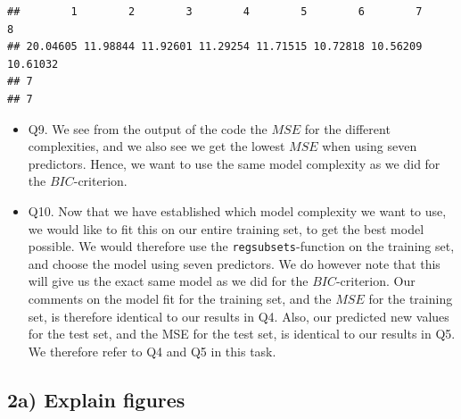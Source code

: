 \documentclass[]{article}
\begin{document}
\begin{verbatim}
##        1        2        3        4        5        6        7        8 
## 20.04605 11.98844 11.92601 11.29254 11.71515 10.72818 10.56209 10.61032 
## 7 
## 7
\end{verbatim}

\begin{itemize}
\item
  Q9. We see from the output of the code the \(MSE\) for the different
  complexities, and we also see we get the lowest \(MSE\) when using
  seven predictors. Hence, we want to use the same model complexity as
  we did for the \(BIC\)-criterion.
\item
  Q10. Now that we have established which model complexity we want to
  use, we would like to fit this on our entire training set, to get the
  best model possible. We would therefore use the
  \texttt{regsubsets}-function on the training set, and choose the model
  using seven predictors. We do however note that this will give us the
  exact same model as we did for the \(BIC\)-criterion. Our comments on
  the model fit for the training set, and the \(MSE\) for the training
  set, is therefore identical to our results in Q4. Also, our predicted
  new values for the test set, and the MSE for the test set, is
  identical to our results in Q5. We therefore refer to Q4 and Q5 in
  this task.
\end{itemize}

\subsection{2a) Explain figures}\label{a-explain-figures}
\end{document}
